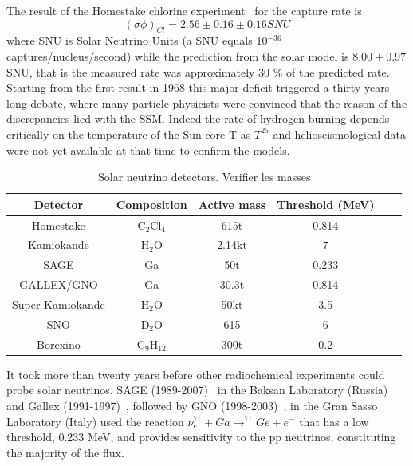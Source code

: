 The result of the Homestake chlorine experiment~\cite{cleveland} for the capture rate  is
\begin{equation}
(\sigma \phi)_{Cl} = 2.56 \pm 0.16 \pm 0.16 SNU
\end{equation}
where SNU is Solar Neutrino Units (a SNU equals 10$^{-36}$ captures/nucleus/second) while the prediction from the solar model is $8.00 \pm 0.97$ SNU, that is the measured rate was approximately 30 \% of the predicted rate.  
Starting from the first result in 1968 this major deficit triggered a thirty years long debate, where many particle physicists were convinced that the reason of the discrepancies lied with the SSM. Indeed the rate of hydrogen burning depends critically on the temperature of the Sun core T as $T^{25}$ and helioseismological data were not yet available at that time to confirm the models. 

\begin{table}
\caption{Solar neutrino detectors. Verifier les masses}
\centering
\begin{tabular}{|c|c|c|c|c|c|}
  \hline
  Detector & Composition & Active mass & Threshold (MeV)  \\ 
  \hline
Homestake & C$_2$Cl$_4$ & 615t &  0.814 \\
Kamiokande & H$_2$O & 2.14kt &  7  \\
SAGE & Ga & 50t &  0.233 \\
GALLEX/GNO & Ga & 30.3t &  0.814  \\
Super-Kamiokande &  H$_2$O & 50kt &  3.5 \\
SNO & D$_2$O & 615 &  6\\
Borexino & C$_9$H$_{12}$ & 300t &  0.2  \\
  \hline
\end{tabular}

\label{tab:snudet}
\end{table}

It took more than twenty years before other radiochemical experiments could probe solar neutrinos. SAGE (1989-2007)~\cite{abdurashitov} in the Baksan Laboratory (Russia) and Gallex (1991-1997)~\cite{hampel}, followed by GNO (1998-2003)~\cite{altmann}, in the Gran Sasso Laboratory (Italy) used the reaction  $\nu_e ^{71} + Ga \rightarrow ^{71}Ge + e^-$
that has a low threshold, 0.233 MeV, and provides sensitivity to the pp neutrinos, constituting the majority of the flux. 

